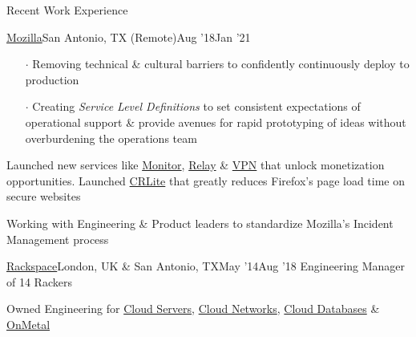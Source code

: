\documentclass{resume} %
\begin{document}
\begin{rSection}{Recent Work Experience}
\begin{rSubsection}{\href{https://www.mozilla.org/}{Mozilla}}{San Antonio, TX (Remote)}{Aug '18}{Jan '21}
\begin{itemize}
  \item[$\cdot$] Removing technical \& cultural barriers to confidently continuously deploy to production
  \item[$\cdot$] Creating \textit{Service Level Definitions} to set consistent expectations of operational support \& provide avenues for rapid prototyping of ideas without overburdening the operations team
        \end{itemize}
  \item Launched new services like \href{https://monitor.firefox.com/}{Monitor}, \href{https://relay.firefox.com/}{Relay} \& \href{https://vpn.mozilla.org/}{VPN} that unlock monetization opportunities. Launched \href{https://blog.mozilla.org/security/2020/01/21/crlite-part-3-speeding-up-secure-browsing/}{CRLite} that greatly reduces Firefox's page load time on secure websites
  \item Working with Engineering \& Product leaders to standardize Mozilla's Incident Management process
\end{rSubsection}


\begin{rSubsection}{\href{https://www.rackspace.com/}{Rackspace}}{London, UK \& San Antonio, TX}{May '14}{Aug '18}
  {Engineering Manager of 14 Rackers}
  \item Owned Engineering for \href{https://www.rackspace.com/openstack/public/servers}{Cloud Servers}, \href{https://www.rackspace.com/openstack/public/networks}{Cloud Networks}, \href{https://www.rackspace.com/openstack/public/databases}{Cloud Databases} \& \href{https://www.rackspace.com/openstack/public/servers/onmetal}{OnMetal}



\end{rSubsection}
\end{rSection}
\end{document}
